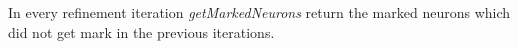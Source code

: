 \begin{theorem}
  \label{th:progress2}
  In every refinement iteration {\em getMarkedNeurons} return the marked neurons which did not get mark in the previous iterations. 
\end{theorem}














